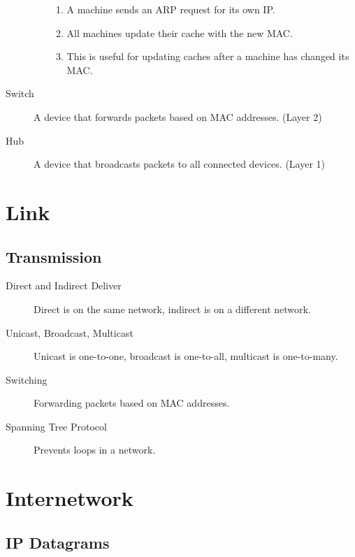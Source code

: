 \documentclass[8pt]{extarticle}
\begin{document}
\begin{description}
\begin{itemize}
                \begin{enumerate}
                  \item A machine sends an ARP request for its own IP.
                  \item All machines update their cache with the new MAC.
                  \item This is useful for updating caches after a machine has changed its MAC.
                \end{enumerate}
        \end{itemize}
  \item[Switch] A device that forwards packets based on MAC addresses. (Layer 2)
  \item[Hub] A device that broadcasts packets to all connected devices. (Layer 1)
\end{description}

\section*{Link}
\subsection*{Transmission}
\begin{description}
  \item[Direct and Indirect Deliver] Direct is on the same network, indirect is on a different network.
  \item[Unicast, Broadcast, Multicast] Unicast is one-to-one, broadcast is one-to-all, multicast is one-to-many.
  \item[Switching] Forwarding packets based on MAC addresses.
  \item[Spanning Tree Protocol] Prevents loops in a network.
\end{description}

\section*{Internetwork}
\subsection*{IP Datagrams}
\end{document}
